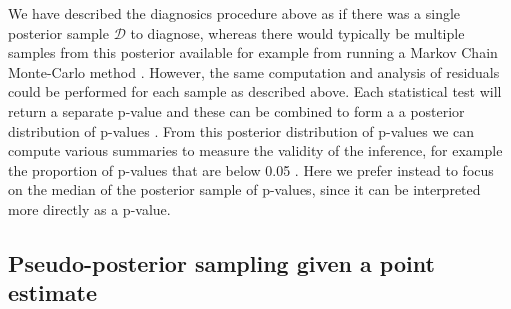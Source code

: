 \documentclass{article}
\begin{document}
We have described the diagnosics procedure above as if there was a single posterior
sample $\mathcal{D}$ to diagnose, whereas there would typically be multiple samples
from this posterior available for example from running a Markov Chain Monte-Carlo
method \citep{Didelot2018}. However, the same computation and analysis of residuals
could be performed for each sample as described above. Each statistical test will
return a separate p-value and these can be combined to form a 
a posterior distribution of p-values \citep{streftarisNonexponentialToleranceInfection2012,lauNewModelDiagnostics2014,gibsonComparisonAssessmentEpidemic2018}.
From this posterior distribution of p-values we can compute
various summaries to measure the validity of the inference,
for example the proportion of p-values that are below 0.05
\citep{lauNewModelDiagnostics2014}. Here we prefer instead
to focus on the median of the posterior sample of p-values,
since it can be interpreted more directly as a p-value.

\subsection*{Pseudo-posterior sampling given a point estimate}
\end{document}
